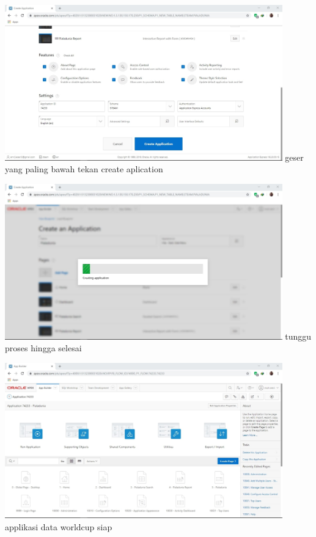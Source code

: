 \documentclass[12pt, times news roman, a4paper] {article}
\begin{document}
	\begin{minipage}{\linewidth}
	\centering
	\includegraphics[width=12cm]{Capture11.jpg} 
	 {geser yang paling bawah tekan create aplication}
\end{minipage}

	\begin{minipage}{\linewidth}
	\centering
	\includegraphics[width=12cm]{Capture12.jpg} 
	 {tunggu proses hingga selesai}
\end{minipage}

\begin{minipage}{\linewidth}
	\centering
	\includegraphics[width=12cm]{Capture13.jpg} 
	 {applikasi data worldcup siap}
\end{minipage}
\end{document}

